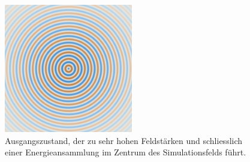 \begin{figure}
    \begin{center}
        \includegraphics[width=0.5\textwidth]{papers/particles/figures/simulations/particle_frames/frame_00.png}
        \caption{Ausgangszustand, der zu sehr hohen Feldstärken und schliesslich einer Energieansammlung im Zentrum des Simulationsfelds führt.}\label{particles:fig:partikel:ausgangszustand}
    \end{center}
\end{figure}